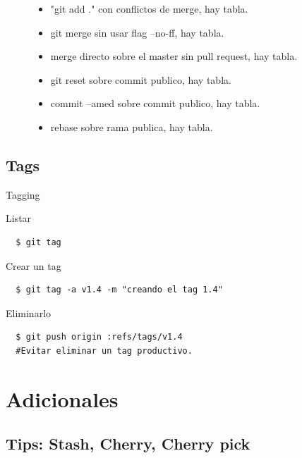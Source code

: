 \documentclass{beamer}
\begin{document}
\begin{frame}[fragile]
\begin{figure}
\begin{minipage}{0.68\textwidth}
\begin{itemize}
	  \item "git add ." con conflictos de merge, hay tabla.
	  \item git merge sin usar flag --no-ff, hay tabla.
	  \item merge directo sobre el master sin pull request, hay tabla.
	  \item git reset sobre commit publico, hay tabla.
	  \item commit --amed sobre commit publico, hay tabla.
	  \item rebase sobre rama publica, hay tabla.
    \end{itemize}	
    \end{minipage}
	\end{figure}
\end{frame}

\subsection{Tags}

\begin{frame}[fragile]{Tagging}
  \begin{block}{Listar}
    \begin{verbatim}
  $ git tag
    \end{verbatim}
  \end{block} 

  \begin{block}{Crear un tag}
    \begin{verbatim}
  $ git tag -a v1.4 -m "creando el tag 1.4"
    \end{verbatim}
  \end{block}

  \begin{block}{Eliminarlo}
    \begin{verbatim}
  $ git push origin :refs/tags/v1.4
  #Evitar eliminar un tag productivo.
    \end{verbatim}
  \end{block}
\end{frame}


\section{Adicionales}

\subsection{Tips: Stash, Cherry, Cherry pick}
\end{document}
